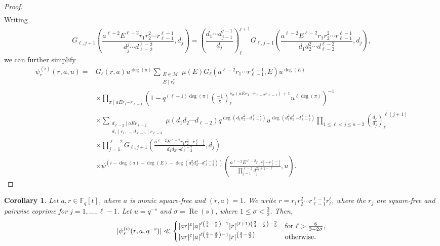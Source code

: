 \documentclass[12pt]{amsart}
\newtheorem{corollary}[theorem]{Corollary}
\DeclareMathOperator{\re}{Re}
\newcommand{\F}{\mathbb{F}}
\newcommand{\legl}[2]{\left( \frac{#1}{#2} \right)_\ell}
\begin{document}
\begin{proof}
\begin{align*}
\end{align*}
Writing 
\[G_{\ell,j+1} \left( \frac{a^{\ell-2}E^{\ell-2}r_1 r_2^2 \cdots r_{\ell-1}^{\ell-1}}{d_{j}^j\cdots d_{\ell-2} ^{\ell-2}} , d_{j} \right)
=\overline{\legl{d_1\cdots d_{j-1}^{j-1}}{d_j}^{j+1}}G_{\ell,j+1} \left( \frac{a^{\ell-2}E^{\ell-2}r_1 r_2^2 \cdots r_{\ell-1}^{\ell-1}}{d_{1}d_2^2\cdots d_{\ell-2} ^{\ell-2}} , d_{j} \right),\]
we can further simplify
\begin{align*}
  \psi_r^{(i)}(r, a,u) =&
 G_\ell(r,a) u^{\deg(a)}\sum_{\substack{E\in \mathcal{M}\\ E \mid r_\ell^* }}\mu(E)G_\ell(a^{\ell-2}r_1\cdots r_{\ell-1}^{\ell-1},E)u^{\deg(E)}\\&\times
  \prod_{\pi \mid aEr_1\cdots r_{\ell-1}}
\left(1 - q^{(\ell-1)\deg(\pi)} \legl{-1}{\pi}^{\nu_\pi(aEr_1\cdots r_{\ell-2}r_{\ell-1})+1}u^{\ell \deg(\pi)}\right)^{-1}\nonumber \\
&\times  \sum_{\substack{d_{\ell-2} \mid aEr_{\ell-2}\\ d_1\mid r_1, \dots, d_{\ell-3}\mid r_{\ell-3}}} \mu(d_1d_2\cdots d_{\ell-2} ) q^{\deg(d_1d_2^2\cdots d_{\ell-2}^{\ell-2})}  u^{\deg(d_1^2d_2^3\cdots d_{\ell-2}^{\ell-1}  )} \prod_{1\leq \ell< j \leq n-2} \overline{\legl{d_\ell}{d_j}^{\ell(j+1)}}\\
& \times \prod_{j=1}^{\ell-2} G_{\ell,j+1} \left( \frac{a^{\ell-2}E^{\ell-2}r_1 r_2^2 \cdots r_{\ell-1}^{\ell-1}}{d_{1}d_2\cdots d_{\ell-2} ^{\ell-2}} , d_{j} \right)\\
&  \times \psi^{(i-\deg(a)-\deg(E)-\deg(d_1^2d_2^3\cdots d_{\ell-2}^{\ell-1} ))} \left( \frac{a^{\ell-2}E^{\ell-2}r_1 r_2^2 \cdots r_{\ell-1}^{\ell-1}}{\prod_{j=1}^{\ell-2}d_j^{2j+2-\ell}}, u \right).
\end{align*}
  \end{proof}

\begin{corollary}
\label{cor_convexity}
 Let $a, r \in \F_q[t]$, where $a$ is monic  square-free and $(r,a)=1$. We write $r = r_1 r_2^2 \cdots r_{\ell-1}^{\ell-1}r_\ell^\ell$, where the $r_j$ are square-free and pairwise coprime for $j=1,\dots,\ell-1$.
Let $u=q^{-s}$ and $\sigma=\re(s)$, where $1 \leq \sigma < \frac32$.
Then,
$$
 |  \psi_r^{(i)}(r, a,q^{-s}) |  \ll \begin{cases}  |a r|^{\varepsilon} |a|^{\ell \left( \frac34 - \frac{\sigma}{2} \right) - 1} |r|^{(\ell+1) \left( \frac34 - \frac{\sigma}{2} \right)  - \frac{3}{2}} &
 \mbox{for $ \ell  > \frac{6}{3 - 2 \sigma},$}\\
  |a r|^{\varepsilon} |a|^{\ell \left( \frac34 - \frac{\sigma}{2} \right) - 1} |r|^{ \left( \frac34 - \frac{\sigma}{2} \right)}  & \mbox{otherwise.} \end{cases}
$$
\end{corollary}
\end{document}
